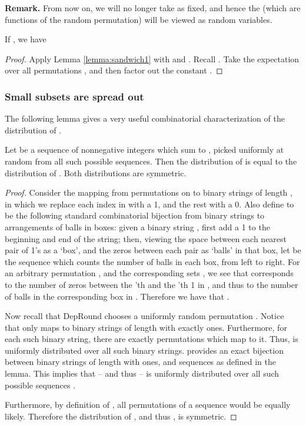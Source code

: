 \smallskip \noindent \textbf{Remark.} From now on, we will no longer take  as fixed, and hence the  (which are functions of the random permutation) will be viewed as random variables.

\smallskip
\begin{lemma} \label{lemma:sandwich}
If , we have 
 
\end{lemma}
\begin{proof}
Apply Lemma \ref{lemma:sandwich1} with  and . Recall . Take the expectation over all permutations , and then factor out the constant .
\end{proof}
\subsubsection{Small subsets are spread out}

The following lemma gives a very useful combinatorial characterization of the distribution of .
\begin{lemma}\label{lemma:bijection}
Let  be a sequence of nonnegative integers which sum to , picked uniformly at random from all such possible sequences. Then the distribution of  is equal to the distribution of . Both distributions are symmetric.
\end{lemma}
\begin{proof}Consider the mapping  from permutations on  to binary strings of length , in which we replace each index in  with a 1, and the rest with a 0. Also define  to be the following standard combinatorial bijection from binary strings to arrangements of balls in boxes: given a binary string , first add a 1 to the beginning and end of the string; then, viewing the space between each nearest pair of 1's as a `box', and the zeros between each pair as `balls' in that box, let  be the sequence which counts the number of balls in each box, from left to right. For an arbitrary permutation , and the corresponding sets , we see that  corresponds to the number of zeros between the 'th and the 'th 1 in , and thus to the number of balls in the corresponding box in . Therefore we have that .
 

Now recall that {\sc DepRound} chooses a uniformly random permutation . Notice that  only maps to binary strings of length  with exactly  ones. Furthermore, for each such binary string, there are exactly  permutations which map to it. Thus,  is uniformly distributed over all  such binary strings.  provides an exact bijection between binary strings of length  with  ones, and sequences  as defined in the lemma. This implies that  -- and thus  -- is uniformly distributed over all such possible sequences . 

Furthermore, by definition of , all permutations of a sequence  would be equally likely. Therefore the distribution of , and thus , is symmetric.
\end{proof}

